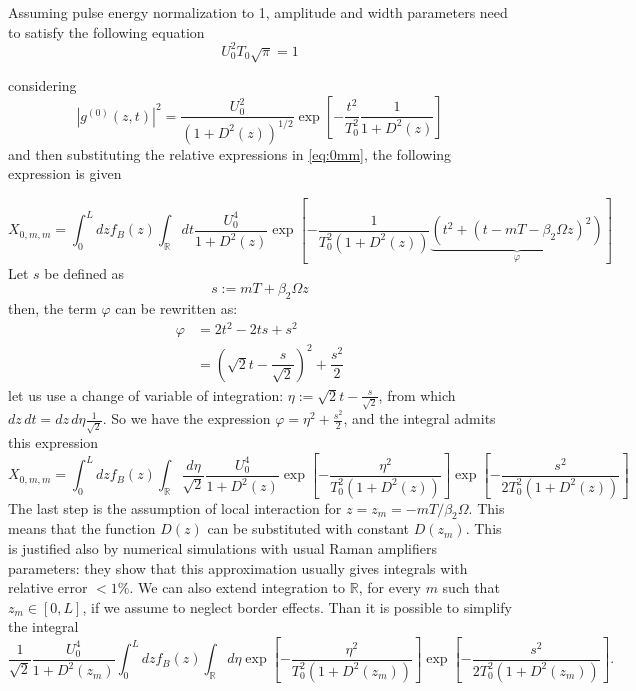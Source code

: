 \documentclass[10pt, lettersize, journal, onecolumn]{IEEEtran}
\begin{document}
Assuming pulse energy normalization to 1, amplitude and width parameters need to satisfy the following equation
\begin{equation}\label{eq:normie}
	U_0^2T_0 \sqrt{\pi} = 1
\end{equation}

considering
\begin{equation}
	|g^{(0)}(z, t)|^2 = \dfrac{U_0^2}{(1+D^2(z))^{1/2}}\exp\left[-\dfrac{t^2}{T_0^2} \dfrac{1}{1+D^2(z)}\right] 
\end{equation}
and then substituting the relative expressions in \ref{eq:0mm}, the following expression is given

\begin{equation}
	X_{0, m, m} = \int_{0}^{L}dz f_B(z) \int_{\mathbb{R}}dt \dfrac{U_0^4}{1+D^2(z)} \exp\left[-\dfrac{1}{T_0^2(1+D^2(z))} \underbrace{\left(t^2 + (t-mT-\beta_2\Omega z)^2\right)}_{\varphi}\right]
\end{equation}
Let $s$ be defined as
\begin{equation}
	s := mT+\beta_2\Omega z
\end{equation}
then, the term $\varphi$ can be rewritten as:
\begin{align}
	\varphi &= 2t^2 - 2ts + s^2 \\
	&= \left(\sqrt{2}t - \dfrac{s}{\sqrt{2}}\right)^2 + \dfrac{s^2}{2}
\end{align}
let us use a change of variable of integration: $\eta := \sqrt{2}t - \frac{s}{\sqrt{2}}$, from which $dz\,dt = dz\,d\eta \frac{1}{\sqrt{2}}$.
So we have the expression $\varphi = \eta^2 + \frac{s^2}{2}$, and the integral admits this expression
\begin{equation}
	X_{0, m, m} = \int_{0}^{L}dz f_B(z) \int_{\mathbb{R}}\dfrac{d\eta}{\sqrt{2}}
	\dfrac{U_0^4}{1+D^2(z)} \exp\left[-\dfrac{\eta^2}{T_0^2(1+D^2(z))} \right] \exp\left[-\dfrac{s^2}{2T_0^2(1+D^2(z))} \right]
\end{equation}
The last step is the assumption of local interaction for $z=z_m=-mT/\beta_2\Omega$. This means that the function $D(z)$ can be substituted with constant $D(z_m)$. This is justified also by numerical simulations with usual Raman amplifiers parameters: they show that this approximation usually gives integrals with relative error $<1\%$. 
We can also extend integration to $\mathbb{R}$, for every $m$ such that $z_m \in [0, L]$, if we assume to neglect border effects.
Than it is possible to simplify the integral
\begin{equation}
	\dfrac{1}{\sqrt{2}} \dfrac{U_0^4}{1+D^2(z_m)}  \int_{0}^{L}dz f_B(z) \int_{\mathbb{R}}d\eta
	\exp\left[-\dfrac{\eta^2}{T_0^2(1+D^2(z_m))} \right] \exp\left[-\dfrac{s^2}{2T_0^2(1+D^2(z_m))} \right].
\end{equation}
\end{document}
